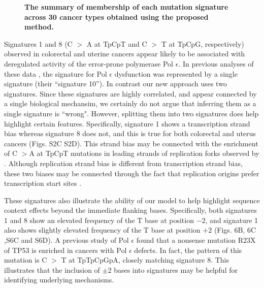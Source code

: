 \documentclass[10pt,letterpaper]{article}
\begin{document}
\begin{figure}[h]
\centering
\caption{{\bf The summary of membership of each mutation signature across 30 cancer types obtained using the proposed method.}}
\label{nature2013_sig_member}
\end{figure}



Signatures 1 and 8 (C $>$ A at TpCpT and C $>$ T at TpCpG, respectively) observed in colorectal and uterine cancers
appear likely to be associated with deregulated activity of the error-prone polymerase Pol $\epsilon$. 
In previous analyses of these data \cite{pmid23945592}, 
the signature for Pol $\epsilon$ dysfunction was represented by a single signature (their ``signature 10'').
In contrast our new approach uses two signatures.
Since these signatures are highly correlated,
and appear connected by
a single biological mechansim, we certainly do not argue
that inferring them as a single signature is ``wrong". However, splitting them into two signatures does help highlight certain features. Specifically,
signature 1 shows a transcription strand bias whereas signature 8 does not, and this is true for both colorectal and uterus cancers (Figs. S2C S2D).
This strand bias may be connected with the enrichment of 
C $>$A at TpCpT mutations in leading strands of replication forks
observed by \cite{pmid25228659}. Although replication strand bias is different from transcription strand bias, these two biases may be connected through the fact that replication origins prefer transcription start sites \cite{pmid23187890}.

These signatures also illustrate the ability of our model
to help highlight sequence context effects beyond the immediate flanking bases. Specifically, both signatures 1 and 8  show an elevated frequency of the T base at position $-2$,
and signature 1 also shows slightly elevated frequency of the T base at position $+2$
 (Figs. 6B, 6C ,S6C and S6D).
A previous study of Pol $\epsilon$  \cite{pmid25228659} 
found that a nonsense mutation R23X of TP53 is enriched in cancers with Pol $\epsilon$ defects.
In fact, the pattern of this mutation is C $>$ T at TpTpCpGpA, closely matching signature 8.
This illustrates that the inclusion of $\pm 2$ bases 
into signatures may be helpful for identifying underlying mechanisms.
\end{document}
